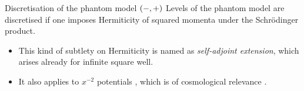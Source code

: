 \documentclass[9pt]{beamer}
\begin{document}
\begin{frame}%
{Discretisation of the phantom model ${\left(-,+\right)}$}%
Levels of the phantom model are \alert{discretised} if one imposes Hermiticity 
of squared momenta under the Schrödinger product.

\begin{itemize}
\item This kind of subtlety on Hermiticity is named as \emph{self-adjoint 
extension}, which arises already for infinite square 
well.
\item It also applies to $x^{-2}$ potentials%
, which is of cosmological relevance%
.
\end{itemize}

\end{frame}
\end{document}
